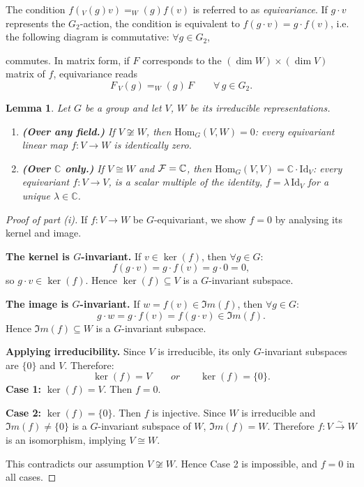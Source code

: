 \documentclass[a4paper,11pt,fleqn]{article}
\theoremstyle{plain}
\newtheorem{lemma}[theorem]{Lemma}
\theoremstyle{definition}
\begin{document}
\noindent
The condition $f(_V(g)v)=_W(g)f(v)$ is referred to as \emph{equivariance}. If $g\cdot v$ represents the $G_2$-action, the condition is equivalent to $f(g\cdot v)=g\cdot f(v)$, i.e. the following diagram is commutative: $\forall g\in G_2$,
commutes.
In matrix form, if $F$ corresponds to the $(\dim W)\times(\dim V)$ matrix of $f$, equivariance reads
\[
  F\,_V(g) = _W(g)\,F
  \qquad\forall\,g\in G_2.
\]

\begin{lemma}
\label{thm:schur}
Let $G$ be a group and let $V$, $W$ be its irreducible representations.
\begin{enumerate}
\item[\normalfont(i)] {\bf (Over any field.)}
  If $V\not\cong W$, then $\mathrm{Hom}_G(V,W)=0$: every
  equivariant linear map $f:V\to W$ is identically zero.
\item[\normalfont(ii)] {\bf (Over $\mathbb{C}$ only.)}
  If $V\cong W$ and ${\cal F}=\mathbb{C}$, then
  $\mathrm{Hom}_G(V,V)=\mathbb{C}\cdot\mathrm{Id}_V$: every equivariant
  $f:V\to V$, is a scalar multiple of the identity, $f=\lambda\,\mathrm{Id}_V$
  for a unique $\lambda\in\mathbb{C}$.
\end{enumerate}
\end{lemma}

\begin{proof}[Proof of part (i)]
If $f:V\to W$ be $G$-equivariant, we show $f=0$ by analysing its kernel and image.

\medskip
\noindent
{\bf The kernel is $G$-invariant.}
If $v\in\ker(f)$, then  $\forall g\in G$:
\[
  f(g\cdot v) = g\cdot f(v) = g\cdot 0 = 0,
\]
so $g\cdot v\in\ker(f)$.
Hence $\ker(f)\subseteq V$ is a $G$-invariant subspace.

\medskip
\noindent
{\bf The image is $G$-invariant.}
If $w=f(v)\in\Im m(f)$, then $\forall g\in G$:
\[
  g\cdot w = g\cdot f(v) = f(g\cdot v)\in\Im m(f).
\]
Hence $\Im m(f)\subseteq W$ is a $G$-invariant subspace.

\medskip
\noindent
{\bf Applying irreducibility.}
Since $V$ is irreducible, its only $G$-invariant subspaces are $\{0\}$ and $V$.
Therefore:
\[
  \ker(f)=V \qquad{or}\qquad \ker(f)=\{0\}.
\]
{\bf Case 1:} $\ker(f)=V$.
Then $f=0$. 

\medskip
\noindent
{\bf Case 2:} $\ker(f)=\{0\}$.
Then $f$ is injective. Since $W$ is irreducible and $\Im m(f)\neq\{0\}$ is a $G$-invariant subspace of $W$, $\Im m(f)=W$.
Therefore $f:V\xrightarrow{\sim}W$ is an isomorphism, implying $V\cong W$.

This contradicts our assumption $V\not\cong W$. Hence Case 2 is impossible, and $f=0$ in all cases.
\end{proof}
\end{document}

